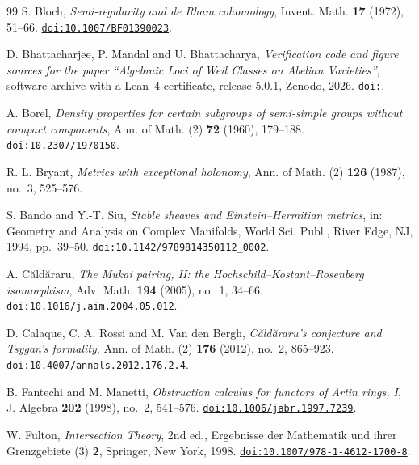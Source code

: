 \documentclass[11pt,reqno]{amsart}
\theoremstyle{plain}
\theoremstyle{definition}
\theoremstyle{remark}
\begin{document}
\begin{thebibliography}{99}
S. Bloch,
\emph{Semi-regularity and de Rham cohomology},
Invent. Math. \textbf{17} (1972), 51--66.
\href{https://doi.org/10.1007/BF01390023}{\texttt{doi:10.1007/BF01390023}}.

D. Bhattacharjee, P. Mandal and U. Bhattacharya,
\emph{Verification code and figure sources for the paper ``Algebraic Loci of
Weil Classes on Abelian Varieties''}, software archive with a Lean~4
certificate, release 5.0.1, Zenodo, 2026.
\href{https://doi.org/\zenodoCodeID}{\texttt{doi:\zenodoCodeID}}.

A. Borel,
\emph{Density properties for certain subgroups of semi-simple groups without
compact components},
Ann. of Math. (2) \textbf{72} (1960), 179--188.
\href{https://doi.org/10.2307/1970150}{\texttt{doi:10.2307/1970150}}.

R. L. Bryant,
\emph{Metrics with exceptional holonomy},
Ann. of Math. (2) \textbf{126} (1987), no.~3, 525--576.

S. Bando and Y.-T. Siu,
\emph{Stable sheaves and Einstein--Hermitian metrics},
in: Geometry and Analysis on Complex Manifolds,
World Sci. Publ., River Edge, NJ, 1994, pp.~39--50.
\href{https://doi.org/10.1142/9789814350112_0002}{\texttt{doi:10.1142/9789814350112\_0002}}.

A. C\u{a}ld\u{a}raru,
\emph{The Mukai pairing, II: the Hochschild--Kostant--Rosenberg isomorphism},
Adv. Math. \textbf{194} (2005), no.~1, 34--66.
\href{https://doi.org/10.1016/j.aim.2004.05.012}{\texttt{doi:10.1016/j.aim.2004.05.012}}.

D. Calaque, C. A. Rossi and M. Van den Bergh,
\emph{C\u{a}ld\u{a}raru's conjecture and Tsygan's formality},
Ann. of Math. (2) \textbf{176} (2012), no.~2, 865--923.
\href{https://doi.org/10.4007/annals.2012.176.2.4}{\texttt{doi:10.4007/annals.2012.176.2.4}}.

B. Fantechi and M. Manetti,
\emph{Obstruction calculus for functors of Artin rings, I},
J. Algebra \textbf{202} (1998), no.~2, 541--576.
\href{https://doi.org/10.1006/jabr.1997.7239}{\texttt{doi:10.1006/jabr.1997.7239}}.

W. Fulton,
\emph{Intersection Theory}, 2nd ed.,
Ergebnisse der Mathematik und ihrer Grenzgebiete (3) \textbf{2},
Springer, New York, 1998.
\href{https://doi.org/10.1007/978-1-4612-1700-8}{\texttt{doi:10.1007/978-1-4612-1700-8}}.


\end{thebibliography}
\end{document}
